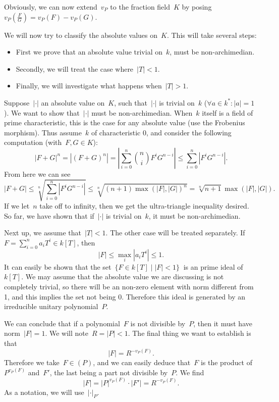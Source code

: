 Obviously, we can now extend~$v_P$ to the fraction field~$K$ by posing~$v_P(\frac{F}{G}) = v_P(F) - v_P(G)$.

We will now try to classify the absolute values on~$K$. This will take several steps:
\begin{itemize}
  \item First we prove that an absolute value trivial on~$k$, must be non-archimedian.
  \item Secondly, we will treat the case where~$|T|<1$.
  \item Finally, we will investigate what happens when~$|T| > 1$.
\end{itemize}

Suppose~$|\cdot|$ an absolute value on~$K$, such that~$|\cdot|$ is trivial on~$k$ ($\forall a \in k^*: |a| = 1$). We want to show that~$|\cdot|$ must be non-archimedian. When~$k$ itself is a field of prime characteristic, this is the case for any absolute value (use the Frobenius morphism). Thus assume~$k$ of characteristic 0, and consider the following computation (with~$F,G \in K$):
\begin{equation}
  |F + G|^n = |(F+G)^n| = \left|\sum_{i=0}^n {n \choose i}F^i G^{n-i} \right| \leq \sum_{i=0}^n \left| F^i G^{n-i} \right|.
\end{equation}
From here we can see
\begin{equation}
  |F+G| \leq \sqrt[n]{\sum_{i=0}^n \left| F^i G^{n-i} \right|} \leq \sqrt[n]{(n+1)\max(|F|, |G|)^n} = \sqrt[n]{n+1} \max(|F|,|G|).
\end{equation}
If we let~$n$ take off to infinity, then we get the ultra-triangle inequality desired. So far, we have shown that if~$|\cdot|$ is trivial on~$k$, it must be non-archimedian.

Next up, we assume that~$|T|< 1$. The other case will be treated separately.
If~$F = \sum_{i=0}^n a_iT^i \in k[T]$, then~
\begin{equation}
  |F| \leq \max_i |a_iT^i| \leq 1.
\end{equation}
It can easily be shown that the set~$ \{ F \in k[T] \mid |F| < 1 \}~$ is an prime ideal of~$k[T]$. We may assume that the absolute value we are discussing is not completely trivial, so there will be an non-zero element with norm different from 1, and this implies the set not being 0. Therefore this ideal is generated by an irreducible unitary polynomial~$P$.

We can conclude that if a polynomial~$F$ is not divisible by~$P$, then it must have norm~$|F| = 1$. We will note~$R = |P| < 1$. The final thing we want to establish is that~
\begin{equation}
  |F| = R^{-v_P(F)}.
\end{equation}
Therefore we take~$F \in (P)$, and we can easily deduce that~$F$ is the product of~$P^{v_P(F)}$ and~$F'$, the last being a part not divisible by~$P$. We find
\begin{equation}
  |F| = |P|^{v_P(F)}\cdot |F'| = R^{-v_P(F)} .
\end{equation}
As a notation, we will use~$|\cdot|_P$.

